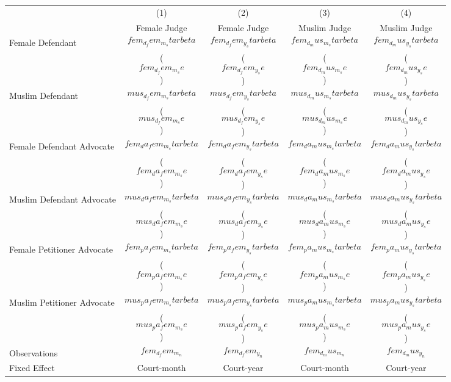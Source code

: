 {
\def\sym#1{\ifmmode^{#1}\else\(^{#1}\)\fi}
\begin{tabular}{l*{4}{c}}
  \hline
&\multicolumn{1}{c}{(1)}&\multicolumn{1}{c}{(2)}&\multicolumn{1}{c}{(3)} &\multicolumn{1}{c}{(4)}\\
&\multicolumn{1}{c}{Female Judge} & \multicolumn{1}{c}{Female Judge} & \multicolumn{1}{c}{Muslim Judge} & \multicolumn{1}{c}{Muslim Judge}\\
\hline

Female Defendant \hspace{15mm}& $$fem_d_fem_m_starbeta$$ & $$fem_d_fem_y_starbeta$$ & $$fem_d_mus_m_starbeta$$  & $$fem_d_mus_y_starbeta$$  \\
& ($$fem_d_fem_m_se$$) & ($$fem_d_fem_y_se$$) &  ($$fem_d_mus_m_se$$) & ($$fem_d_mus_y_se$$)  \\[2.5mm] 

Muslim Defendant \hspace{15mm}& $$mus_d_fem_m_starbeta$$ & $$mus_d_fem_y_starbeta$$ & $$mus_d_mus_m_starbeta$$  & $$mus_d_mus_y_starbeta$$  \\
& ($$mus_d_fem_m_se$$) & ($$mus_d_fem_y_se$$) &  ($$mus_d_mus_m_se$$) & ($$mus_d_mus_y_se$$)  \\[2.5mm]

Female Defendant Advocate\hspace{15mm}& $$fem_da_fem_m_starbeta$$ & $$fem_da_fem_y_starbeta$$ & $$fem_da_mus_m_starbeta$$  & $$fem_da_mus_y_starbeta$$  \\
& ($$fem_da_fem_m_se$$) & ($$fem_da_fem_y_se$$) &  ($$fem_da_mus_m_se$$) & ($$fem_da_mus_y_se$$)  \\[2.5mm] 

Muslim Defendant Advocate\hspace{15mm}& $$mus_da_fem_m_starbeta$$ & $$mus_da_fem_y_starbeta$$ & $$mus_da_mus_m_starbeta$$  & $$mus_da_mus_y_starbeta$$  \\
& ($$mus_da_fem_m_se$$) & ($$mus_da_fem_y_se$$) &  ($$mus_da_mus_m_se$$) & ($$mus_da_mus_y_se$$)  \\[2.5mm]

Female Petitioner Advocate\hspace{15mm}& $$fem_pa_fem_m_starbeta$$ & $$fem_pa_fem_y_starbeta$$ & $$fem_pa_mus_m_starbeta$$  & $$fem_pa_mus_y_starbeta$$  \\
& ($$fem_pa_fem_m_se$$) & ($$fem_pa_fem_y_se$$) &  ($$fem_pa_mus_m_se$$) & ($$fem_pa_mus_y_se$$)  \\[2.5mm] 

Muslim Petitioner Advocate\hspace{15mm}& $$mus_pa_fem_m_starbeta$$ & $$mus_pa_fem_y_starbeta$$ & $$mus_pa_mus_m_starbeta$$  & $$mus_pa_mus_y_starbeta$$  \\
& ($$mus_pa_fem_m_se$$) & ($$mus_pa_fem_y_se$$) &  ($$mus_pa_mus_m_se$$) & ($$mus_pa_mus_y_se$$)  \\[2.5mm] \hline

Observations \hspace{15mm}& $$fem_d_fem_m_n$$ & $$fem_d_fem_y_n$$ & $$fem_d_mus_m_n$$  & $$fem_d_mus_y_n$$  \\

Fixed Effect & Court-month & Court-year & Court-month& Court-year  \\
\hline\hline
\end{tabular}
}
 
